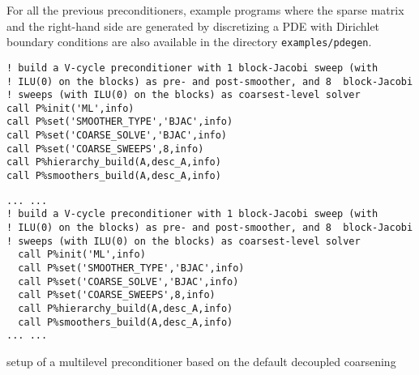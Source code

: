 For all the previous preconditioners, example programs where the sparse matrix and
the right-hand side are generated by discretizing a PDE with Dirichlet
boundary conditions are also available in the directory \verb|examples/pdegen|.
\vspace{-1em}\begin{listing}[tbh]
\ifpdf%
\begin{verbatim}
! build a V-cycle preconditioner with 1 block-Jacobi sweep (with
! ILU(0) on the blocks) as pre- and post-smoother, and 8  block-Jacobi
! sweeps (with ILU(0) on the blocks) as coarsest-level solver
call P%init('ML',info)
call P%set('SMOOTHER_TYPE','BJAC',info)
call P%set('COARSE_SOLVE','BJAC',info)
call P%set('COARSE_SWEEPS',8,info)
call P%hierarchy_build(A,desc_A,info)
call P%smoothers_build(A,desc_A,info)
\end{verbatim}
\else%
\begin{center}
\begin{minipage}{.90\textwidth}
{\small
\begin{verbatim}
... ...
! build a V-cycle preconditioner with 1 block-Jacobi sweep (with
! ILU(0) on the blocks) as pre- and post-smoother, and 8  block-Jacobi
! sweeps (with ILU(0) on the blocks) as coarsest-level solver
  call P%init('ML',info)
  call P%set('SMOOTHER_TYPE','BJAC',info)
  call P%set('COARSE_SOLVE','BJAC',info)
  call P%set('COARSE_SWEEPS',8,info)
  call P%hierarchy_build(A,desc_A,info)
  call P%smoothers_build(A,desc_A,info)
... ...
\end{verbatim}
}
\end{minipage}
\end{center}
\fi\vspace{-2em}%
\caption{setup of a multilevel preconditioner based on the default decoupled coarsening\label{fig:ex2}}
\end{listing}\vspace*{-2em}
